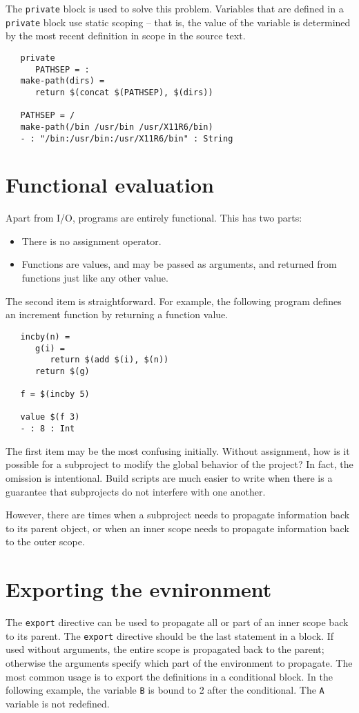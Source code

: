 The \verb+private+ block is used to solve this problem.  Variables
that are defined in a \verb+private+ block use static scoping -- that
is, the value of the variable is determined by the most recent
definition in scope in the source text.

\begin{verbatim}
   private
      PATHSEP = :
   make-path(dirs) =
      return $(concat $(PATHSEP), $(dirs))

   PATHSEP = /
   make-path(/bin /usr/bin /usr/X11R6/bin)
   - : "/bin:/usr/bin:/usr/X11R6/bin" : String
\end{verbatim}

\section{Functional evaluation}

Apart from I/O,  programs are entirely functional.  This has two parts:

\begin{itemize}
\item There is no assignment operator.
\item Functions are values, and may be passed as arguments, and returned from
      functions just like any other value.
\end{itemize}

The second item is straightforward.  For example, the following program defines
an increment function by returning a function value.

\begin{verbatim}
   incby(n) =
      g(i) =
         return $(add $(i), $(n))
      return $(g)

   f = $(incby 5)

   value $(f 3)
   - : 8 : Int
\end{verbatim}

The first item may be the most confusing initially.  Without assignment, how is
it possible for a subproject to modify the global behavior of the project?  In fact,
the omission is intentional.  Build scripts are much easier to write when there
is a guarantee that subprojects do not interfere with one another.

However, there are times when a subproject needs to propagate
information back to its parent object, or when an inner scope needs to
propagate information back to the outer scope.

\section{Exporting the evnironment}
\label{section:export}
The \verb+export+ directive can be used to propagate all or part of an inner scope back to its
parent.  The \verb+export+ directive should be the last statement in a block.  If used without
arguments, the entire scope is propagated back to the parent; otherwise the arguments specify which
part of the environment to propagate.  The most common usage is to export the definitions in a
conditional block.  In the following example, the variable \verb+B+ is bound to 2 after the
conditional.  The \verb+A+ variable is not redefined.

